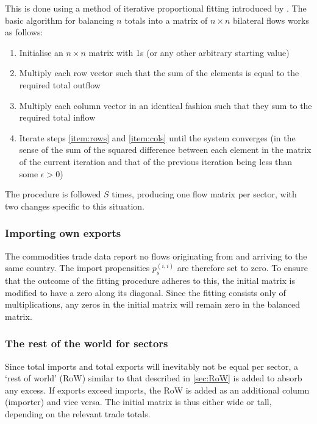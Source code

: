 \documentclass[a4paper]{article}
\begin{document}
This is done using a method of iterative proportional fitting introduced by \textcite{deming_least_1940}.
The basic algorithm for balancing $n$ totals into a matrix of $n \times n$ bilateral flows works as follows:
\begin{enumerate}
\itemsep -0.2em 
\item Initialise an $n \times n$ matrix with 1s (or any other arbitrary starting value)
\item Multiply each row vector such that the sum of the elements is equal to the required total outflow \label{item:rows}
\item Multiply each column vector in an identical fashion such that they sum to the required total inflow \label{item:cols}
\item Iterate steps \ref{item:rows} and \ref{item:cols} until the system converges (in the sense of the sum of the squared difference between each element in the matrix of the current iteration and that of the previous iteration being less than some $\epsilon > 0$)
\end{enumerate}
The procedure is followed $S$ times, producing one flow matrix per sector, with two changes specific to this situation.
\subsubsection{Importing own exports}
The commodities trade data report no flows originating from and arriving to the same country.
The import propensities $p_s^{(i,i)}$ are therefore set to zero.
To ensure that the outcome of the fitting procedure adheres to this, the initial matrix is modified to have a zero along its diagonal.
Since the fitting consists only of multiplications, any zeros in the initial matrix will remain zero in the balanced matrix.

\subsubsection{The rest of the world for sectors}
Since total imports and total exports will inevitably not be equal per sector, a `rest of world' (RoW) similar to that described in \cref{sec:RoW} is added to absorb any excess.
If exports exceed imports, the RoW is added as an additional column (importer) and vice versa.
The initial matrix is thus either wide or tall, depending on the relevant trade totals.
\end{document}

